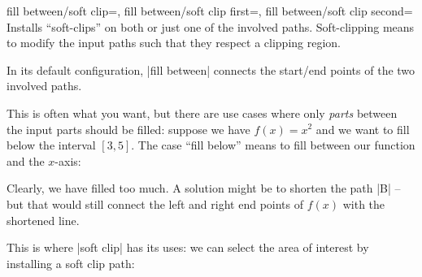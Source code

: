 \begin{tikzkeylist}{%
    fill between/soft clip=,
    fill between/soft clip first=,
    fill between/soft clip second=%
}
    Installs ``soft-clips'' on both or just one of the involved paths.
    Soft-clipping means to modify the input paths such that they respect a
    clipping region.

    In its default configuration, |fill between| connects the start/end points
    of the two involved paths.

    This is often what you want, but there are use cases where only
    \emph{parts} between the input parts should be filled: suppose we have
    $f(x)=x^2$ and we want to fill below the interval $[3,5]$. The case ``fill
    below'' means to fill between our function and the $x$-axis:
\begin{codeexample}[]
\end{codeexample}
    \noindent Clearly, we have filled too much. A solution might be to shorten
    the path |B| -- but that would still connect the left and right end points
    of $f(x)$ with the shortened line.

    This is where |soft clip| has its uses: we can select the area of interest
    by installing a soft clip path:
\begin{codeexample}[]
\end{codeexample}


\end{tikzkeylist}
